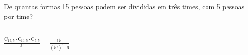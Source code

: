\begin{ex}
 	De quantas formas 15 pessoas podem ser divididas em três times, com 5 pessoas por time?
 	  \begin{sol}
 	    \phantom{A} \\
 	    $\frac{\mathrm{C}_{{15},5}\cdot\mathrm{C}_{{10},5}\cdot\mathrm{C}_{5,5}}{3!}=\frac{15!}{(5!)^3\cdot6}$
 	  \end{sol}
\end{ex}
